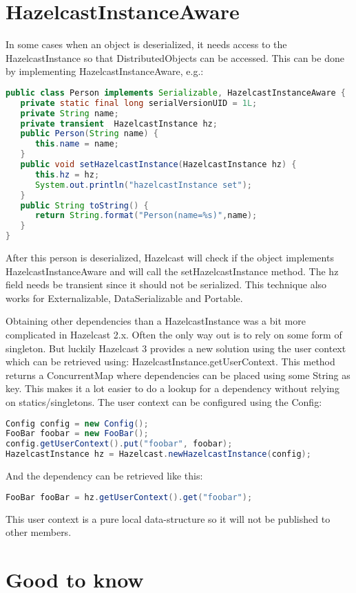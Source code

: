 \section{HazelcastInstanceAware}
In some cases when an object is deserialized, it needs access to the HazelcastInstance so that DistributedObjects can be accessed. This can be done by implementing HazelcastInstanceAware, e.g.:
\begin{lstlisting}[language=java]
public class Person implements Serializable, HazelcastInstanceAware {
   private static final long serialVersionUID = 1L;
   private String name;
   private transient  HazelcastInstance hz;
   public Person(String name) {
      this.name = name;
   }
   public void setHazelcastInstance(HazelcastInstance hz) {
      this.hz = hz;
      System.out.println("hazelcastInstance set");
   }
   public String toString() {
      return String.format("Person(name=%s)",name);
   }
}
\end{lstlisting}
After this person is deserialized, Hazelcast will check if the object implements HazelcastInstanceAware and will call the setHazelcastInstance method. The hz field needs be transient since it should not be serialized. This technique also works for Externalizable, DataSerializable and Portable.

Obtaining other dependencies than a HazelcastInstance was a bit more complicated in Hazelcast 2.x. Often the only way out is to rely on some form of singleton. But luckily Hazelcast 3 provides a new solution using the user context which can be retrieved using: HazelcastInstance.getUserContext. This method returns a ConcurrentMap where dependencies can be placed using some String as key. This makes it a lot easier to do a lookup for a dependency without relying on statics/singletons. The user context can be configured using the Config:
\begin{lstlisting}[language=java]
Config config = new Config();
FooBar foobar = new FooBar();
config.getUserContext().put("foobar", foobar);
HazelcastInstance hz = Hazelcast.newHazelcastInstance(config);
\end{lstlisting}
And the dependency can be retrieved like this:
\begin{lstlisting}[language=java]
FooBar fooBar = hz.getUserContext().get("foobar");
\end{lstlisting}
This user context is a pure local data-structure so it will not be published to other members.

\section{Good to know}

